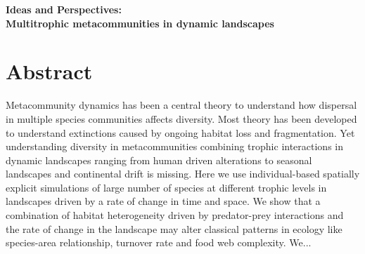 \documentclass[10pt]{article}
\date{}
\begin{document}
\begin{flushleft}
{\Large
\textbf{Ideas and Perspectives:\\ Multitrophic metacommunities in dynamic landscapes}
}
\end{flushleft}

\section*{Abstract}

Metacommunity dynamics has been a central theory to understand how
dispersal in multiple species communities affects diversity. Most
theory has been developed to understand extinctions caused by ongoing
habitat loss and fragmentation. Yet understanding diversity in
metacommunities combining trophic interactions in dynamic landscapes
ranging from human driven alterations to seasonal landscapes and
continental drift is missing. Here we use individual-based spatially
explicit simulations of large number of species at different trophic
levels in landscapes driven by a rate of change in time and space. We
show that a combination of habitat heterogeneity driven by
predator-prey interactions and the rate of change in the landscape may
alter classical patterns in ecology like species-area relationship,
turnover rate and food web complexity. We...

\end{document}
